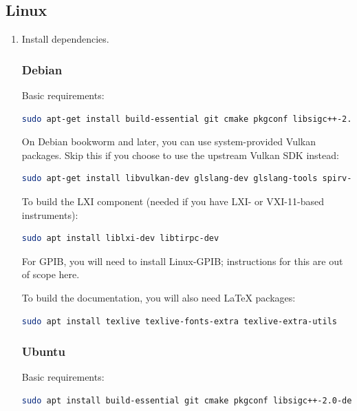 \subsection{Linux}
\begin{enumerate}

\item Install dependencies.

\subsubsection{Debian}

Basic requirements:
\begin{lstlisting}[language=sh, numbers=none]
sudo apt-get install build-essential git cmake pkgconf libsigc++-2.0-dev libyaml-cpp-dev catch2 libglfw3-dev curl xzip libhidapi-dev
\end{lstlisting}

On Debian bookworm and later, you can use system-provided Vulkan packages. Skip this if you choose to use the upstream Vulkan SDK instead:
\begin{lstlisting}[language=sh, numbers=none]
sudo apt-get install libvulkan-dev glslang-dev glslang-tools spirv-tools glslc
\end{lstlisting}

To build the LXI component (needed if you have LXI- or VXI-11-based instruments):
\begin{lstlisting}[language=sh, numbers=none]
sudo apt install liblxi-dev libtirpc-dev
\end{lstlisting}

For GPIB, you will need to install Linux-GPIB; instructions for this are out of scope here.

To build the documentation, you will also need LaTeX packages:
\begin{lstlisting}[language=sh, numbers=none]
sudo apt install texlive texlive-fonts-extra texlive-extra-utils
\end{lstlisting}

\subsubsection{Ubuntu}

Basic requirements:
\begin{lstlisting}[language=sh, numbers=none]
sudo apt install build-essential git cmake pkgconf libsigc++-2.0-dev libyaml-cpp-dev catch2 libglfw3-dev curl xzip libhidapi-dev
\end{lstlisting}


\end{enumerate}

